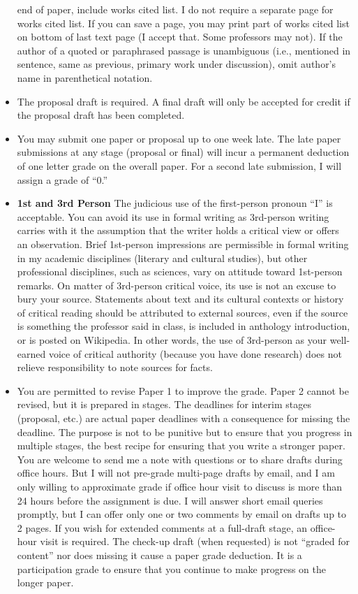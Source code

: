 \documentclass[]{article}
\begin{document}
\begin{itemize}
  end of paper, include works cited list. I do not require a separate
  page for works cited list. If you can save a page, you may print part
  of works cited list on bottom of last text page (I accept that. Some
  professors may not). If the author of a quoted or paraphrased passage
  is unambiguous (i.e., mentioned in sentence, same as previous, primary
  work under discussion), omit author's name in parenthetical notation.
\item
  The proposal draft is required. A final draft will only be accepted
  for credit if the proposal draft has been completed.
\item
  You may submit one paper or proposal up to one week late. The late
  paper submissions at any stage (proposal or final) will incur a
  permanent deduction of one letter grade on the overall paper. For a
  second late submission, I will assign a grade of ``0.''
\item
  \textbf{1st and 3rd Person} The judicious use of the first-person
  pronoun ``I'' is acceptable. You can avoid its use in formal writing
  as 3rd-person writing carries with it the assumption that the writer
  holds a critical view or offers an observation. Brief 1st-person
  impressions are permissible in formal writing in my academic
  disciplines (literary and cultural studies), but other professional
  disciplines, such as sciences, vary on attitude toward 1st-person
  remarks. On matter of 3rd-person critical voice, its use is not an
  excuse to bury your source. Statements about text and its cultural
  contexts or history of critical reading should be attributed to
  external sources, even if the source is something the professor said
  in class, is included in anthology introduction, or is posted on
  Wikipedia. In other words, the use of 3rd-person as your well-earned
  voice of critical authority (because you have done research) does not
  relieve responsibility to note sources for facts.
\item
  You are permitted to revise Paper 1 to improve the grade. Paper 2
  cannot be revised, but it is prepared in stages. The deadlines for
  interim stages (proposal, etc.) are actual paper deadlines with a
  consequence for missing the deadline. The purpose is not to be
  punitive but to ensure that you progress in multiple stages, the best
  recipe for ensuring that you write a stronger paper. You are welcome
  to send me a note with questions or to share drafts during office
  hours. But I will not pre-grade multi-page drafts by email, and I am
  only willing to approximate grade if office hour visit to discuss is
  more than 24 hours before the assignment is due. I will answer short
  email queries promptly, but I can offer only one or two comments by
  email on drafts up to 2 pages. If you wish for extended comments at a
  full-draft stage, an office-hour visit is required. The check-up draft
  (when requested) is not ``graded for content'' nor does missing it
  cause a paper grade deduction. It is a participation grade to ensure
  that you continue to make progress on the longer paper.
\end{itemize}
\end{document}
